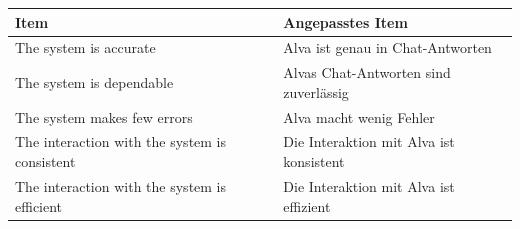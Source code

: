 \begin{center}
\begin{threeparttable}
\caption{Items für Konstrukt: CI}
\label{tab:CI}
\begin{tabularx}{\textwidth}{X X}
\toprule
\textbf{Item} & \textbf{Angepasstes Item} \\
\midrule
The system is accurate & Alva ist genau in Chat-Antworten \\
The system is dependable & Alvas Chat-Antworten sind zuverlässig \\
The system makes few errors & Alva macht wenig Fehler \\
The interaction with the system is consistent & Die Interaktion mit Alva ist konsistent \\
The interaction with the system is efficient & Die Interaktion mit Alva ist effizient \\
\bottomrule
\end{tabularx}
\end{threeparttable}
\end{center}
\vspace{1em}